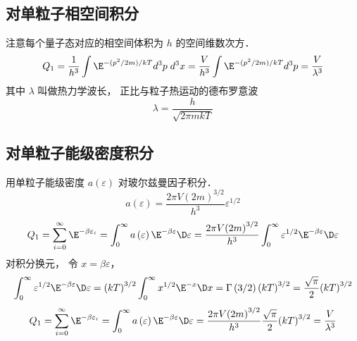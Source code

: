\subsection{对单粒子相空间积分}
注意每个量子态对应的相空间体积为 $h$ 的空间维数次方．
\begin{equation}
{Q_1} = \frac{1}{{{h^3}}}\int {{\E^{ - ({p^2}/2m)/kT}}{d^3}p\;{d^3}x}  = \frac{V}{{{h^3}}}\int {{\E^{ - ({p^2}/2m)/kT}}{d^3}p}  = \frac{V}{{{\lambda ^3}}}
\end{equation}
其中 $\lambda $ 叫做热力学波长， 正比与粒子热运动的德布罗意波
\begin{equation}
\lambda  = \frac{h}{{\sqrt {2\pi mkT} }}
\end{equation}

\subsection{对单粒子能级密度积分}
用单粒子能级密度 $a\left( \varepsilon  \right)$ 对玻尔兹曼因子积分．
\begin{equation}
a\left( \varepsilon  \right) = \frac{{2\pi V{{\left( {2m} \right)}^{3/2}}}}{{{h^3}}}{\varepsilon ^{1/2}}
\end{equation}
\begin{equation}
{Q_1} = \sum\limits_{i = 0}^\infty  {{\E^{ - \beta {\varepsilon _i}}}}  = \int_0^\infty  {a\left( \varepsilon  \right){\E^{ - \beta \varepsilon }}\D \varepsilon }  \\
= \frac{{2\pi V{{\left( {2m} \right)}^{3/2}}}}{{{h^3}}}\int_0^\infty  {{\varepsilon ^{1/2}}{\E^{ - \beta \varepsilon }}\D \varepsilon }
\end{equation}
对积分换元， 令 $x = \beta \varepsilon $， 
\begin{equation}
\int_0^\infty  {{\varepsilon ^{1/2}}{\E^{ - \beta \varepsilon }}\D \varepsilon } = {\left( {kT} \right)^{3/2}}\int_0^\infty  {{x^{1/2}}{\E^{ - x}}\D x}
= \Gamma \left( {3/2} \right){\left( {kT} \right)^{3/2}}
= \frac{{\sqrt \pi  }}{2}{\left( {kT} \right)^{3/2}}
\end{equation}
\begin{equation}
{Q_1} = \sum\limits_{i = 0}^\infty  {{\E^{ - \beta {\varepsilon _i}}}}  = \int_0^\infty  {a\left( \varepsilon  \right){\E^{ - \beta \varepsilon }}\D\varepsilon } = \frac{{2\pi V{{\left( {2m} \right)}^{3/2}}}}{{{h^3}}}\frac{{\sqrt \pi  }}{2}{\left( {kT} \right)^{3/2}}  = \frac{V}{{{\lambda ^3}}}
\end{equation}

